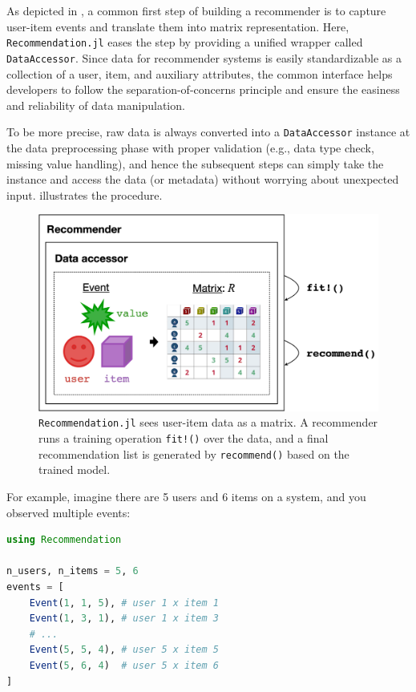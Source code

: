 As depicted in , a common first step of building a recommender is to capture user-item events and translate them into matrix representation. Here, \texttt{Recommendation.jl} eases the step by providing a unified wrapper called \texttt{DataAccessor}. Since data for recommender systems is easily standardizable as a collection of a user, item, and auxiliary attributes, the common interface helps developers to follow the separation-of-concerns principle and ensure the easiness and reliability of data manipulation. 

To be more precise, raw data is always converted into a \texttt{DataAccessor} instance at the data preprocessing phase with proper validation (e.g., data type check, missing value handling), and hence the subsequent steps can simply take the instance and access the data (or metadata) without worrying about unexpected input.  illustrates the procedure.

\begin{figure}[htbp]
    \centering
    \includegraphics[width=0.8\linewidth]{images/accessor.pdf}
    \caption{\texttt{Recommendation.jl} sees user-item data as a matrix. A recommender runs a training operation \texttt{fit!()} over the data, and a final recommendation list is generated by \texttt{recommend()} based on the trained model.}
    \label{fig:accessor}
\end{figure}

For example, imagine there are 5 users and 6 items on a system, and you observed multiple events:

\begin{lstlisting}[language = Julia]
using Recommendation

n_users, n_items = 5, 6
events = [
    Event(1, 1, 5), # user 1 x item 1
    Event(1, 3, 1), # user 1 x item 3
    # ...
    Event(5, 5, 4), # user 5 x item 5
    Event(5, 6, 4)  # user 5 x item 6
]
\end{lstlisting}

